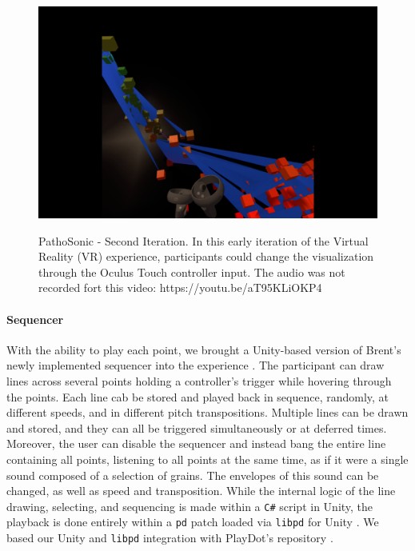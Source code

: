 \documentclass{nime-alternate}
\begin{document}
\begin{figure}[htbp]
       \centering
              \includegraphics[width=1\textwidth]{second_iteration.png}
       \label{PathoSonic - Second Iteration. In this early iteration of the Virtual Reality (VR) experience, participants could change the visualization through the Oculus Touch controller input. The audio was not recorded fort this video: https://youtu.be/aT95KLiOKP4}
       \caption{PathoSonic - Second Iteration. In this early iteration of the Virtual Reality (VR) experience, participants could change the visualization through the Oculus Touch controller input. The audio was not recorded fort this video: https://youtu.be/aT95KLiOKP4}
\end{figure}

\paragraph{Sequencer}

With the ability to play each point, we brought a Unity-based version of Brent's newly implemented sequencer into the experience \cite{wbrent2019}. The participant can draw lines across several points holding a controller's trigger while hovering through the points. Each line cab be stored and played back in sequence, randomly, at different speeds, and in different pitch transpositions. Multiple lines can be drawn and stored, and they can all be triggered simultaneously or at deferred times. Moreover, the user can disable the sequencer and instead bang the entire line containing all points, listening to all points at the same time, as if it were a single sound composed of a selection of grains. The envelopes of this sound can be changed, as well as speed and transposition. While the internal logic of the line drawing, selecting, and sequencing is made within a \texttt{C\#} script in Unity, the playback is done entirely within a \texttt{pd} patch loaded via \texttt{libpd} for Unity \cite{libpd2019}. We based our Unity and \texttt{libpd} integration with PlayDot's repository \cite{playdots2019}.
\end{document}
